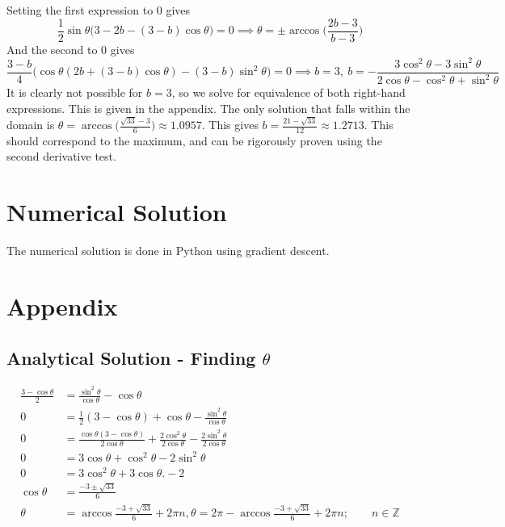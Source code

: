 \documentclass{article}
\begin{document}
Setting the first expression to 0 gives
$$ \frac{1}{2} \sin \theta \big(3 - 2b - (3-b)\cos \theta) = 0 \implies \theta = \pm \arccos \bigg( \frac{2b-3}{b-3} \bigg)$$
And the second to 0 gives 
$$  \frac{3-b}{4} \big (\cos \theta (2b + (3-b)\cos \theta ) - (3-b) \sin^2 \theta \big) =0  \implies b = 3, \ b = -\frac{3\cos^2 \theta - 3 \sin^2 \theta}{2 \cos \theta 	- \cos^2 \theta + \sin ^2 \theta}$$
It is clearly not possible for $b = 3$, so we solve for equivalence of both right-hand expressions. This is given in the appendix. The only solution that falls within the domain is $\theta = \arccos \big(\frac{\sqrt{33} - 3}{6} \big) \approx 1.0957$. This gives $b = \frac{21 - \sqrt{33}}{12} \approx 1.27	13$. This should correspond to the maximum, and can be rigorously proven using the second derivative test.

\section*{Numerical Solution}
The numerical solution is done in Python using gradient descent. 

\section*{Appendix}
\subsection*{Analytical Solution - Finding $\theta$}
\begin{align*}
	\frac{3 - \cos \theta}{2} &= \frac{\sin^2 \theta }{\cos \theta} - \cos \theta \\
	0 &= \frac{1}{2}(3 - \cos \theta ) + \cos \theta  - \frac{\sin^2 \theta}{\cos \theta} \\
	0 &= \frac{\cos \theta (3- \cos \theta)}{2 \cos \theta} + \frac{2\cos^2 \theta }{2\cos \theta} - \frac{2 \sin^2 \theta}{2 \cos \theta }\\
	0 &= 3 \cos \theta + \cos^2 \theta - 2 \sin^2 \theta  \\
		0 &= 3 \cos^2 \theta + 3 \cos \theta. - 2 \\
	\cos\theta &= \frac{-3 \pm \sqrt{33}}{6} \\
	\theta &= \arccos \frac{-3 + \sqrt{33}}{6} + 2 \pi n, \theta = 2\pi - \arccos \frac{-3 + \sqrt{33}}{6} + 2 \pi n; \qquad n \in \mathbb{Z}
	\end{align*}
\end{document}
